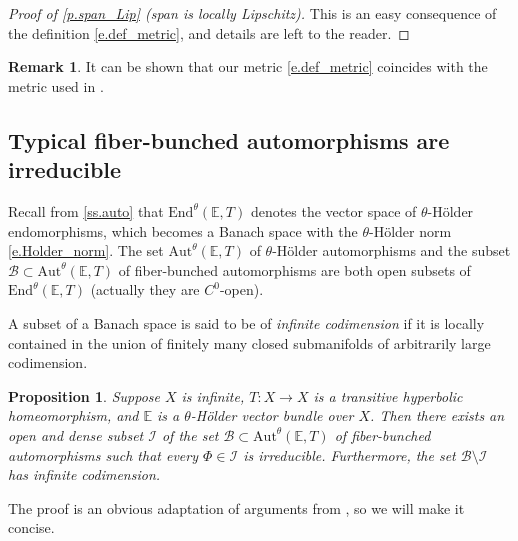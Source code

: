 \documentclass[10pt]{amsart}
\let\mathcal\mathscr
\theoremstyle{plain}
\newtheorem{proposition}[theorem]{Proposition}
\theoremstyle{definition}
\newtheorem{remark}[theorem]{Remark}
\newcommand{\EE}{\mathbb{E}}
\newcommand{\cB}{\mathcal{B}}
\newcommand{\cI}{\mathcal{I}}
\newcommand{\Aut}{\mathrm{Aut}}
\newcommand{\End}{\mathrm{End}}
\begin{document}
\begin{proof}[Proof of \cref{p.span_Lip} (span is locally Lipschitz)]
This is an easy consequence of the definition \eqref{e.def_metric}, and details are left to the reader.
\end{proof}

\begin{remark}
It can be shown that our metric \eqref{e.def_metric} coincides with the metric used in \cite[\S A.1]{BPS}.
\end{remark}

\subsection{Typical fiber-bunched automorphisms are irreducible}\label{ss.irred_typical}
Recall from \cref{ss.auto} that $\End^\theta(\EE,T)$ denotes the vector space of $\theta$-Hölder endomorphisms, which becomes a Banach space with the $\theta$-Hölder norm \eqref{e.Holder_norm}.
The set $\Aut^\theta(\EE,T)$ of $\theta$-Hölder automorphisms
and the subset $\cB \subset \Aut^\theta(\EE,T)$ of fiber-bunched automorphisms
are both open subsets of $\End^\theta(\EE,T)$ (actually they are $C^0$-open).

A subset of a Banach space is said to be of \emph{infinite codimension} if it is locally contained in the union of finitely many closed submanifolds of arbitrarily large codimension.

\begin{proposition}\label{p.irred_typical}
Suppose $X$ is infinite, $T \colon X \to X$ is a transitive hyperbolic homeomorphism, and $\EE$ is a $\theta$-Hölder vector bundle over $X$.
Then there exists an open and dense subset $\cI$ of the set $\cB \subset \Aut^\theta(\EE,T)$ of fiber-bunched automorphisms such that every $\Phi \in \cI$ is irreducible.
Furthermore, the set $\cB \setminus \cI$ has infinite codimension.
\end{proposition}

The proof is an obvious adaptation of arguments from \cite{BGV,Viana}, so we will make it concise.
\end{document}

